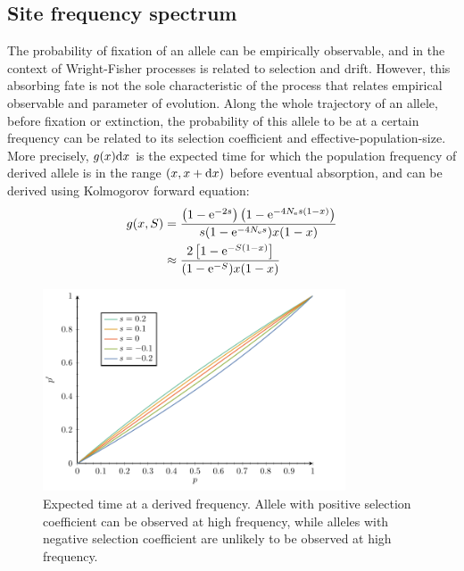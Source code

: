 \subsection{Site frequency spectrum}
The probability of fixation of an \gls{allele} can be empirically observable, and in the context of Wright-Fisher processes is related to selection and drift. 
However, this absorbing fate is not the sole characteristic of the process that relates empirical observable and parameter of evolution. 
Along the whole trajectory of an \gls{allele}, before fixation or extinction, the probability of this \gls{allele} to be at a certain frequency can be related to its selection coefficient and \gls{effective-population-size}.
More precisely, $g(x) \mathrm{d} x $ is the expected time for which the population frequency of derived \gls{allele} is in the range $(x, x+\mathrm{d} x)$ before eventual absorption, and can be derived using Kolmogorov forward equation:
\begin{align}
g(x, S) & = \dfrac{\left( 1 - \mathrm{e}^{- 2 s }\right) \left( 1 - \mathrm{e}^{-4 N_{\textrm{e}} s(1-x)}\right)}{ s (1 - \mathrm{e}^{-4 N_{\textrm{e}} s})x(1-x)} \\
& \approx \dfrac{2 \left[ 1 - \mathrm{e}^{-S(1-x)}\right]}{(1 - \mathrm{e}^{-S})x(1-x)} \label{eq:expected_time}
\end{align}

\begin{figure}[H]
	\begin{center}
		\includegraphics[width=0.8\textwidth, page=4] {figures.pdf}
	\end{center}
	\caption[Expected time at a derived frequency]{Expected time at a derived frequency. Allele with positive selection coefficient can be observed at high frequency, while alleles with negative selection coefficient are unlikely to be observed at high frequency.}
\end{figure}

